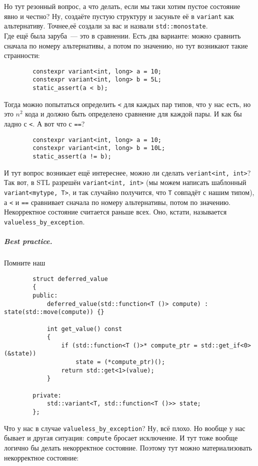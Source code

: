 \documentclass{article}
\begin{document}
    Но тут резонный вопрос, а что делать, если мы таки хотим пустое состояние явно и честно? Ну, создаёте пустую структуру и засуньте её в \texttt{variant} как альтернативу. Точнее,её создали за вас и назвали \texttt{std::monostate}.\\
    Где ещё была заруба~--- это в сравнении. Есть два варианте: можно сравнить сначала по номеру альтернативы, а потом по значению, но тут возникают такие странности:
    \begin{verbatim}
        constexpr variant<int, long> a = 10;
        constexpr variant<int, long> b = 5L;
        static_assert(a < b);
    \end{verbatim}
    Тогда можно попытаться определить \texttt{<} для каждых пар типов, что у нас есть, но это $n^2$ кода и должно быть определено сравнение для каждой пары. И как бы ладно с \texttt{<}. А вот что с \texttt{==}?
    \begin{verbatim}
        constexpr variant<int, long> a = 10;
        constexpr variant<int, long> b = 10L;
        static_assert(a != b);
    \end{verbatim}
    И тут вопрос возникает ещё интереснее, можно ли сделать \texttt{veriant<int, int>}?\\
    Так вот, в STL разрешён \texttt{variant<int, int>} (мы можем написать шаблонный \texttt{variant<mytype, T>}, и так случайно получится, что \texttt{T} совпадёт с нашим типом), а \texttt{<} и \texttt{==} сравнивает сначала по номеру альтернативы, потом по значению. Некорректное состояние считается раньше всех. Оно, кстати, называется \texttt{valueless_by_exception}.
    \subparagraph{Best practice.}
    Помните наш
    \begin{verbatim}
        struct deferred_value
        {
        public:
            deferred_value(std::function<T ()> compute) : state(std::move(compute)) {}
            
            int get_value() const
            {
                if (std::function<T ()>* compute_ptr = std::get_if<0>(&state))
                    state = (*compute_ptr)();
                return std::get<1>(value);
            }
            
        private:
            std::variant<T, std::function<T ()>> state;
        };
    \end{verbatim}
    Что у нас в случае \texttt{valueless_by_exception}? Ну, всё плохо. Но вообще у нас бывает и другая ситуация: \texttt{compute} бросает исключение. И тут тоже вообще логично бы делать некорректное состояние. Поэтому тут можно материализовать некорректное состояние:
\end{document}
